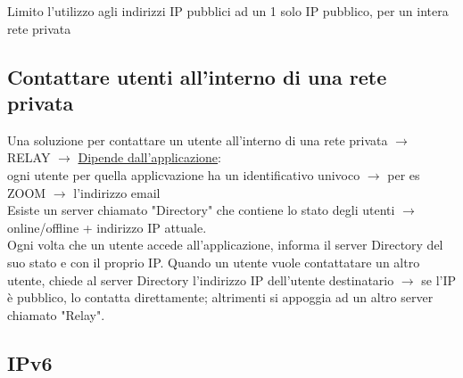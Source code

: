 \documentclass[a4paper]{article}
\begin{document}
 Limito l'utilizzo agli indirizzi IP pubblici ad un
 1 solo IP pubblico, per un intera rete privata


\subsection{Contattare utenti all'interno di una rete privata}
Una soluzione per contattare un utente all'interno di una rete privata $\rightarrow$ RELAY
$\rightarrow$ \underline{Dipende dall'applicazione}:\\
\indent 
ogni utente per quella applicvazione ha un identificativo univoco $\rightarrow$ per es ZOOM $\rightarrow$ l'indirizzo email
\\
\noindent
Esiste un server chiamato "Directory" che contiene lo stato degli utenti $\rightarrow$ online/offline + indirizzo IP attuale.
\\ 
Ogni volta che un utente accede all'applicazione, informa il server Directory del suo stato e con il proprio IP. 
Quando un utente vuole contattatare un altro utente, chiede al server Directory l'indirizzo IP dell'utente destinatario $\rightarrow$ se l'IP è pubblico, 
lo contatta direttamente; altrimenti si appoggia ad un altro server chiamato "Relay". 

\subsection{IPv6}
\end{document}
